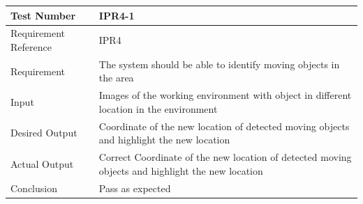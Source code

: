 \documentclass[12pt, titlepage]{article}
\begin{document}
\begin{table}[H]
\begin{center}
\begin{tabular}{|l | m{9cm}|}
\hline
  Test Number & IPR4-1\\
  \hline
  Requirement Reference & IPR4\\
  \hline
  Requirement &  The system should be able to identify moving objects in the area\\
  \hline
  Input & Images of the working environment with object in different location in the environment\\
  \hline
  Desired Output & Coordinate of the new location of detected moving objects and highlight the new location\\
  \hline
  Actual Output & Correct Coordinate of the new location of detected moving objects and highlight the new location\\
  \hline
  Conclusion & Pass as expected\\
  \hline
\end{tabular}
\end{center}           
\end{table}
\end{document}
